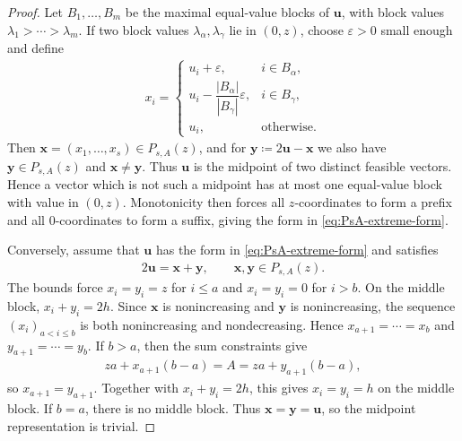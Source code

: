 \documentclass[10pt,a4paper]{article}
\begin{document}
    \begin{proof}
        Let $B_1,\ldots,B_m$ be the maximal equal-value blocks of $\mathbf{u}$, with
        block values $\lambda_1>\cdots>\lambda_m$.  If two block values
        $\lambda_\alpha,\lambda_\gamma$ lie in $(0,z)$, choose $\varepsilon>0$ small
        enough and define
        \begin{align*}
          x_i=
          \begin{cases}
            u_i+\varepsilon, & i\in B_\alpha,\\
            u_i-\dfrac{|B_\alpha|}{|B_\gamma|}\varepsilon, & i\in B_\gamma,\\
            u_i, & \text{otherwise}.
          \end{cases}
        \end{align*}
        Then $\mathbf{x}=(x_1,\ldots,x_s)\in P_{s,A}(z)$, and for $\mathbf{y}\coloneqq2\mathbf{u}-\mathbf{x}$
        we also have $\mathbf{y}\in P_{s,A}(z)$ and $\mathbf{x}\ne\mathbf{y}$.  Thus
        $\mathbf{u}$ is the midpoint of two distinct feasible vectors.  Hence a vector
        which is not such a midpoint has at most one equal-value block with value in
        $(0,z)$.  Monotonicity then forces all $z$-coordinates to form a prefix and all
        $0$-coordinates to form a suffix, giving the form in \eqref{eq:PsA-extreme-form}.
        
        Conversely, assume that $\mathbf{u}$ has the form in \eqref{eq:PsA-extreme-form} and satisfies 
        \begin{align}\label{eq:midpoint-decomp}
          2\mathbf{u}=\mathbf{x}+\mathbf{y},
          \qquad
          \mathbf{x},\mathbf{y}\in P_{s,A}(z).
        \end{align}
        The bounds force $x_i=y_i=z$ for $i\le a$ and $x_i=y_i=0$ for $i>b$.  On the
        middle block, $x_i+y_i=2h$.  Since $\mathbf{x}$ is nonincreasing and
        $\mathbf{y}$ is nonincreasing, the sequence $(x_i)_{a<i\le b}$ is both
        nonincreasing and nondecreasing.  Hence
        $x_{a+1}=\cdots=x_b$ and $y_{a+1}=\cdots=y_b$.  If $b>a$, then the sum
        constraints give
        \begin{align*}
          za+x_{a+1}(b-a)=A=za+y_{a+1}(b-a),
        \end{align*}
        so $x_{a+1}=y_{a+1}$.  Together with $x_i+y_i=2h$, this gives
        $x_i=y_i=h$ on the middle block.  If $b=a$, there is no middle block.  Thus
        $\mathbf{x}=\mathbf{y}=\mathbf{u}$, so the midpoint representation is trivial.
    \end{proof}
    
\end{document}
